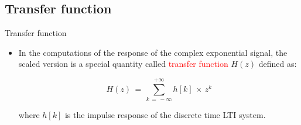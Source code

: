 \documentclass{beamer}
\begin{document}
\subsection{Transfer function}
\begin{frame}[t,allowframebreaks]{Transfer function}

\begin{itemize}

\item In the computations of the response of the complex exponential signal, the scaled version is a special quantity called \textcolor{red}{transfer function} $H(z)$ defined as:

\begin{equation}
H(z) \, = \, \displaystyle\sum_{k \, = \, - \infty}^{+ \infty} h[k] \, \times \, z^k
\end{equation}

where $h[k]$ is the impulse response of the discrete time LTI system.

\end{itemize}

\end{frame}
\end{document}
